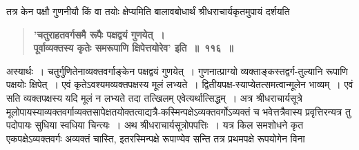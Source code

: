 \documentclass[11pt, openany]{book}
\begin{document}
\begin{sloppypar}
{\small तत्र केन पक्षौ गुणनीयौ किं वा तयोः क्षेप्यमिति बालावबोधार्थं {\color{violet}श्रीधराचार्य}कृतमुपायं दर्शयति\textendash }

 \label{8.116}
\begin{quote}
{\large \textbf{{\color{purple}'चतुराहतवर्गसमै रूपैः पक्षद्वयं गुणयेत्~।\\
पूर्वाव्यक्तस्य कृतेः समरूपाणि क्षिपेत्तयोरेव'} इति~{\color{purple}॥~११६~॥}}}
\end{quote}

अस्यार्थः~। चतुर्गुणितेनाव्यक्तवर्गाङ्केन पक्षद्वयं गुणयेत्~। गुणनात्प्राग्यो व्यक्ताङ्कस्तद्वर्ग-तुल्यानि रूपाणि पक्षयोः क्षिपेत्~। एवं कृतेऽवश्यमव्यक्तपक्षस्य मूलं लभ्यते~। द्वितीयपक्ष-स्याप्येतत्समत्वान्मूलेन भाव्यम्~। एवं सति व्यक्तपक्षस्य यदि मूलं न लभ्यते तदा तत्खिलम् एवेत्यर्थात्सिद्धम्~। अत्र श्रीधराचार्यसूत्रे मूलोपायस्याव्यक्तवर्गाव्यक्तसापेक्षतयोक्तत्वाद्यत्रै-कस्मिन्पक्षेऽव्यक्तवर्गोऽव्यक्तं च भवेत्तत्रैवास्य प्रवृत्तिरन्यत्र तु पदोपायः सुधिया स्वधिया चिन्त्यः~। अथ श्रीधराचार्यसूत्रोपपत्तिः~। यत्र किल समशोधने कृत एकपक्षेऽव्यक्तवर्गः अव्यक्तं चास्ति, इतरस्मिन्पक्षे रूपाण्येव सन्ति तत्र प्रथमपक्षे रूपयोगेन विना
\end{sloppypar}

\newpage
\end{document}
